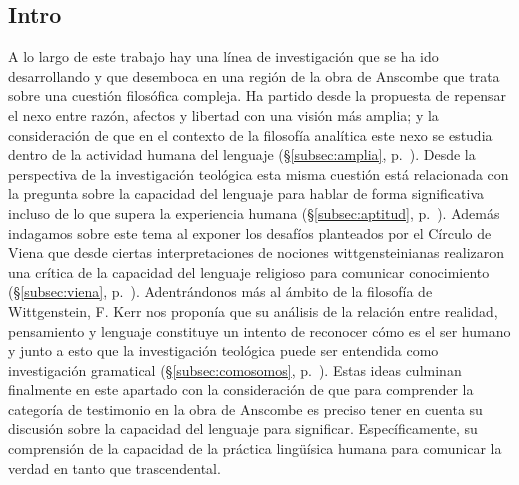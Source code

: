 \subsection{Intro}

A lo largo de este trabajo hay una línea de investigación que se ha ido desarrollando y que desemboca en una región de la obra de Anscombe que trata sobre una cuestión filosófica compleja. Ha partido desde la propuesta de repensar el nexo entre razón, afectos y libertad con una visión más amplia; y la consideración de que en el contexto de la filosofía analítica este nexo se estudia dentro de la actividad humana del lenguaje (\S\ref{subsec:amplia}, p.~\pageref{subsec:amplia}). Desde la perspectiva de la investigación teológica esta misma cuestión está relacionada con la pregunta sobre la capacidad del lenguaje para hablar de forma significativa incluso de lo que supera la experiencia humana (\S\ref{subsec:aptitud}, p.~\pageref{subsec:aptitud}). Además indagamos sobre este tema al exponer los desafíos planteados por el Círculo de Viena que desde ciertas interpretaciones de nociones wittgensteinianas realizaron una crítica de la capacidad del lenguaje religioso para comunicar conocimiento (\S\ref{subsec:viena}, p.~\pageref{subsec:viena}). Adentrándonos más al ámbito de la filosofía de Wittgenstein, F. Kerr nos proponía que su análisis de la relación entre realidad, pensamiento y lenguaje constituye un intento de reconocer cómo es el ser humano y junto a esto que la investigación teológica puede ser entendida como investigación gramatical (\S\ref{subsec:comosomos}, p.~\pageref{subsec:comosomos}). Estas ideas culminan finalmente en este apartado con la consideración de que para comprender la categoría de testimonio en la obra de Anscombe es preciso tener en cuenta su discusión sobre la capacidad del lenguaje para significar. Específicamente, su comprensión de la capacidad de la práctica lingüísica humana para comunicar la verdad en tanto que trascendental. 

